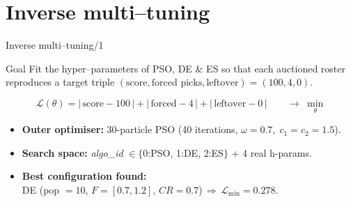 \documentclass[aspectratio=169]{beamer}
\begin{document}
\section{Inverse multi–tuning}
\begin{frame}{Inverse multi–tuning/1}
	\small
	\begin{block}{Goal}
     Fit the hyper–parameters
	of \alert{PSO, DE \& ES} so that each auctioned
	roster reproduces a target triple
	$(\text{score},\text{forced picks},\text{leftover})=(100,4,0)$.
	\end{block}
	\medskip
	\[
	\mathcal L(\theta)=|\,\text{score}-100\,|+
	|\,\text{forced}-4\,|+
	|\,\text{leftover}-0\,|
	\qquad\longrightarrow\;\min_{\theta}
	\]
	
	\begin{itemize}
		\item \textbf{Outer optimiser:} 30-particle PSO (40 iterations,
		$\omega\!=\!0.7,\;c_1\!=c_2\!=\!1.5$).
		\item \textbf{Search space:}
		\emph{algo\_id} $\in\{$0:PSO, 1:DE, 2:ES$\}$ + 4 real h-params.
		\item \textbf{Best configuration found:}\\
		DE (pop $=10$, $F\!=[0.7,1.2]$, $CR\!=0.7$)\,$\Rightarrow\,
		\mathcal L_{\min}=0.278$.
	\end{itemize}
	

\end{frame}
\end{document}
